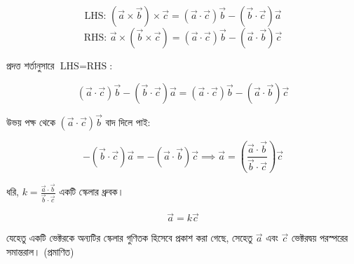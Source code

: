 \documentclass{article}
\begin{document}
$$\text{LHS: } (\vec{a} \times \vec{b}) \times \vec{c} = (\vec{a} \cdot \vec{c})\vec{b} - (\vec{b} \cdot \vec{c})\vec{a}$$
$$\text{RHS: } \vec{a} \times (\vec{b} \times \vec{c}) = (\vec{a} \cdot \vec{c})\vec{b} - (\vec{a} \cdot \vec{b})\vec{c}$$

প্রদত্ত শর্তানুসারে $\text{LHS} = \text{RHS}$:

$$(\vec{a} \cdot \vec{c})\vec{b} - (\vec{b} \cdot \vec{c})\vec{a} = (\vec{a} \cdot \vec{c})\vec{b} - (\vec{a} \cdot \vec{b})\vec{c}$$

উভয় পক্ষ থেকে $(\vec{a} \cdot \vec{c})\vec{b}$ বাদ দিলে পাই:

$$-(\vec{b} \cdot \vec{c})\vec{a} = -(\vec{a} \cdot \vec{b})\vec{c} \implies \vec{a} = \left(\frac{\vec{a} \cdot \vec{b}}{\vec{b} \cdot \vec{c}}\right)\vec{c}$$

ধরি, $k = \frac{\vec{a} \cdot \vec{b}}{\vec{b} \cdot \vec{c}}$ একটি স্কেলার ধ্রুবক।

$$\vec{a} = k\vec{c}$$

যেহেতু একটি ভেক্টরকে অন্যটির স্কেলার গুণিতক হিসেবে প্রকাশ করা গেছে, সেহেতু $\vec{a}$ এবং $\vec{c}$ ভেক্টরদ্বয় পরস্পরের সমান্তরাল। (প্রমাণিত)
\end{document}
